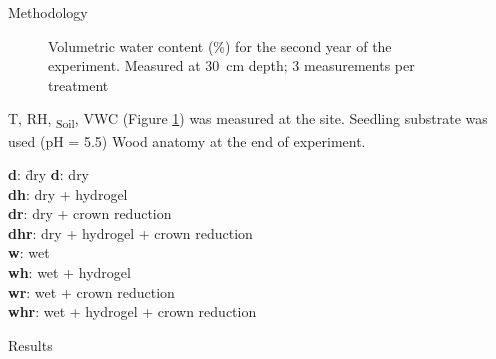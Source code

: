 \documentclass[final]{beamer}
\newlength{\sepwidth}
\newlength{\colwidth}
\newcommand{\separatorcolumn}{\begin{column}{\sepwidth}\end{column}}
\begin{document}
\begin{frame}[t]
\begin{columns}[t]
\begin{column}{\colwidth}
\begin{block}{Methodology}
    \begin{minipage}[t]{0.45\textwidth}
        \begin{figure}
            
            \caption{Volumetric water content (\%) for the second year of the experiment. Measured at \SI{30}{\centi\meter} depth; 3 measurements per treatment}
            \label{fig:vwc}
        \end{figure}
    \end{minipage}\hfill
    \begin{minipage}[t]{0.45\textwidth}
        T, RH, \Psi\textsubscript{Soil}, VWC (Figure \ref{fig:vwc}) was measured at the site. Seedling substrate was used (pH = 5.5) Wood anatomy at the end of experiment.
        \begin{tabbing}
            \textbf{d}: \quad\= dry \kill
            \textbf{d}: \>  dry \\
            \textbf{dh}: \>  dry + hydrogel \\
            \textbf{dr}: \>  dry + crown reduction\\
            \textbf{dhr}: \>  dry + hydrogel + crown reduction \\
            \textbf{w}: \>  wet \\
            \textbf{wh}: \>  wet + hydrogel \\
            \textbf{wr}: \>  wet + crown reduction\\
            \textbf{whr}: \>  wet + hydrogel + crown reduction
        \end{tabbing}
    \end{minipage}\hfill
\end{block}

\begin{block}{Results}
   \begin{figure}
       \caption{}
       \label{fig:sap}
   \end{figure}
\end{block}

\end{column}


\begin{column}{\colwidth}


\end{column}
\end{columns}
\end{frame}
\end{document}
